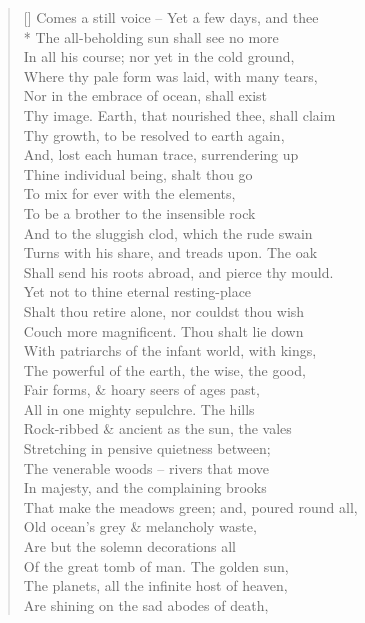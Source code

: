 \documentclass[MAIN]{subfiles}
\begin{document}
\begin{verse}[\versewidth]
{\color{white} Comes a still voice --} Yet a few days, and thee\\*
The all-beholding sun shall see no more\\
In all his course; nor yet in the cold ground,\\
Where thy pale form was laid, with many tears,\\
Nor in the embrace of ocean, shall exist\\
Thy image. Earth, that nourished thee, shall claim\\
Thy growth, to be resolved to earth again,\\
And, lost each human trace, surrendering up\\
Thine individual being, shalt thou go\\
To mix for ever with the elements,\\
To be a brother to the insensible rock\\
And to the sluggish clod, which the rude swain\\
Turns with his share, and treads upon. The oak\\
Shall send his roots abroad, and pierce thy mould.\\
Yet not to thine eternal resting-place\\
Shalt thou retire alone, nor couldst thou wish\\
Couch more magnificent. Thou shalt lie down\\
With patriarchs of the infant world, with kings,\\
The powerful of the earth, the wise, the good,\\
Fair forms, \& hoary seers of ages past,\\
All in one mighty sepulchre.   The hills\\
Rock-ribbed \& ancient as the sun, the vales\\
Stretching in pensive quietness between;\\
The venerable woods -- rivers that move\\
In majesty, and the complaining brooks\\
That make the meadows green; and, poured round all,\\
Old ocean's grey \& melancholy waste,\\
Are but the solemn decorations all\\
Of the great tomb of man. The golden sun,\\
The planets, all the infinite host of heaven,\\
Are shining on the sad abodes of death,\\

\end{verse}
\end{document}

